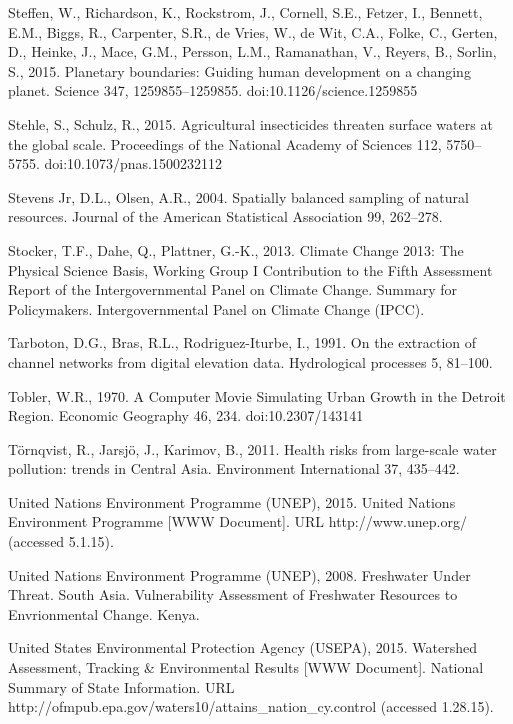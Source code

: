 \begin{thebibliography}
\bibitem{} \hangindent=1cm Steffen, W., Richardson, K., Rockstrom, J., Cornell, S.E., Fetzer, I., Bennett, E.M., Biggs, R., Carpenter, S.R., de Vries, W., de Wit, C.A., Folke, C., Gerten, D., Heinke, J., Mace, G.M., Persson, L.M., Ramanathan, V., Reyers, B., Sorlin, S., 2015. Planetary boundaries: Guiding human development on a changing planet. Science 347, 1259855–1259855. doi:10.1126/science.1259855

\bibitem{} \hangindent=1cm Stehle, S., Schulz, R., 2015. Agricultural insecticides threaten surface waters at the global scale. Proceedings of the National Academy of Sciences 112, 5750–5755. doi:10.1073/pnas.1500232112

\bibitem{} \hangindent=1cm Stevens Jr, D.L., Olsen, A.R., 2004. Spatially balanced sampling of natural resources. Journal of the American Statistical Association 99, 262–278.

\bibitem{} \hangindent=1cm Stocker, T.F., Dahe, Q., Plattner, G.-K., 2013. Climate Change 2013: The Physical Science Basis, Working Group I Contribution to the Fifth Assessment Report of the Intergovernmental Panel on Climate Change. Summary for Policymakers. Intergovernmental Panel on Climate Change (IPCC).

\bibitem{} \hangindent=1cm Tarboton, D.G., Bras, R.L., Rodriguez-Iturbe, I., 1991. On the extraction of channel networks from digital elevation data. Hydrological processes 5, 81–100.

\bibitem{} \hangindent=1cm Tobler, W.R., 1970. A Computer Movie Simulating Urban Growth in the Detroit Region. Economic Geography 46, 234. doi:10.2307/143141

\bibitem{} \hangindent=1cm Törnqvist, R., Jarsjö, J., Karimov, B., 2011. Health risks from large-scale water pollution: trends in Central Asia. Environment International 37, 435–442.

\bibitem{} \hangindent=1cm United Nations Environment Programme (UNEP), 2015. United Nations Environment Programme [WWW Document]. URL http://www.unep.org/ (accessed 5.1.15).

\bibitem{} \hangindent=1cm United Nations Environment Programme (UNEP), 2008. Freshwater Under Threat. South Asia. Vulnerability Assessment of Freshwater Resources to Envrionmental Change. Kenya.

\bibitem{} \hangindent=1cm United States Environmental Protection Agency (USEPA), 2015. Watershed Assessment, Tracking & Environmental Results [WWW Document]. National Summary of State Information. URL http://ofmpub.epa.gov/waters10/attains_nation_cy.control (accessed 1.28.15).


\end{thebibliography}
